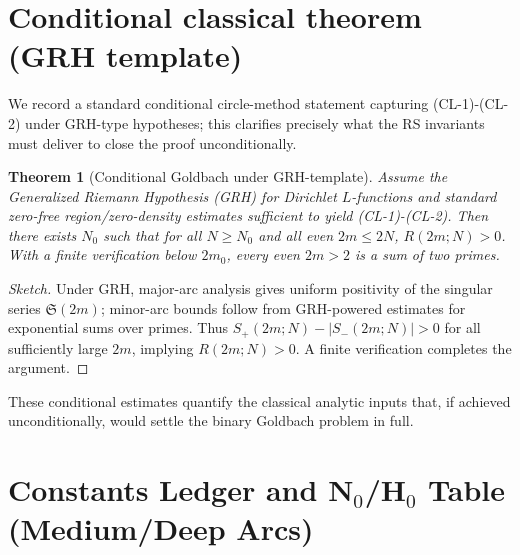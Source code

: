 \documentclass[11pt]{article}
\newtheorem{theorem}{Theorem}
\theoremstyle{definition}
\theoremstyle{remark}
\begin{document}





\section{Conditional classical theorem (GRH template)}\label{sec:conditional}
We record a standard conditional circle-method statement capturing (CL-1)-(CL-2) under GRH-type hypotheses; this clarifies precisely what the RS invariants must deliver to close the proof unconditionally.

\begin{theorem}[Conditional Goldbach under GRH-template]\label{thm:grh_template}
Assume the Generalized Riemann Hypothesis (GRH) for Dirichlet $L$-functions and standard zero-free region/zero-density estimates sufficient to yield (CL-1)-(CL-2). Then there exists $N_0$ such that for all $N\ge N_0$ and all even $2m\le 2N$, $R(2m;N)>0$. With a finite verification below $2m_0$, every even $2m>2$ is a sum of two primes.
\end{theorem}

\begin{proof}[Sketch]
Under GRH, major-arc analysis gives uniform positivity of the singular series $\mathfrak S(2m)$; minor-arc bounds follow from GRH-powered estimates for exponential sums over primes. Thus $S_+(2m;N)-|S_-(2m;N)|>0$ for all sufficiently large $2m$, implying $R(2m;N)>0$. A finite verification completes the argument.
\end{proof}

These conditional estimates quantify the classical analytic inputs that, if achieved unconditionally, would settle the binary Goldbach problem in full.


\clearpage
\section*{Constants Ledger and N$_0$/H$_0$ Table (Medium/Deep Arcs)}
\end{document}
